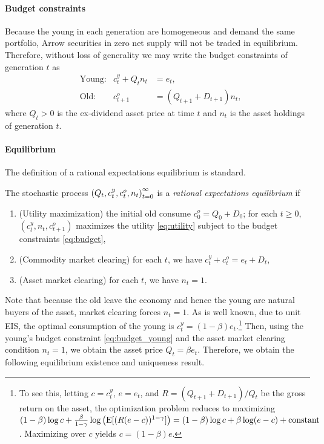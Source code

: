 \documentclass[a4paper,12pt]{article}
\numberwithin{equation}{section}
\theoremstyle{plain}
\begin{document}
\paragraph{Budget constraints}

Because the young in each generation are homogeneous and demand the same portfolio, Arrow securities in zero net supply will not be traded in equilibrium. Therefore, without loss of generality we may write the budget constraints of generation $t$ as
\begin{subequations}\label{eq:budget}
\begin{align}
    &\text{Young:} & c_t^y+Q_tn_t&=e_t, \label{eq:budget_young}\\
    &\text{Old:} & c_{t+1}^o&=(Q_{t+1}+D_{t+1})n_t, \label{eq:budget_old}
\end{align}
\end{subequations}
where $Q_t>0$ is the ex-dividend asset price at time $t$ and $n_t$ is the asset holdings of generation $t$.

\paragraph{Equilibrium}

The definition of a rational expectations equilibrium is standard.

\begin{defn}\label{defn:eq_toy}
The stochastic process $\set{(Q_t,c_t^y,c_t^o,n_t)}_{t=0}^\infty$ is a \emph{rational expectations equilibrium} if
\begin{enumerate}
    \item (Utility maximization) the initial old consume $c_0^o=Q_0+D_0$; for each $t\ge 0$, $(c_t^y,n_t,c_{t+1}^o)$ maximizes the utility \eqref{eq:utility} subject to the budget constraints \eqref{eq:budget},
    \item (Commodity market clearing) for each $t$, we have $c_t^y+c_t^o=e_t+D_t$,
    \item (Asset market clearing) for each $t$, we have $n_t=1$.
\end{enumerate}
\end{defn}

Note that because the old leave the economy and hence the young are natural buyers of the asset, market clearing forces $n_t=1$. As is well known, due to unit EIS, the optimal consumption of the young is $c_t^y=(1-\beta)e_t$.\footnote{To see this, letting $c=c_t^y$, $e=e_t$, and $R=(Q_{t+1}+D_{t+1})/Q_t$ be the gross return on the asset, the optimization problem reduces to maximizing $(1-\beta)\log c+\frac{\beta}{1-\gamma}\log \left(\operatorname{E}[(R(e-c))^{1-\gamma}]\right)=(1-\beta)\log c+\beta \log (e-c)+\text{constant}$. Maximizing over $c$ yields $c=(1-\beta)e$.} Then, using the young's budget constraint \eqref{eq:budget_young} and the asset market clearing condition $n_t=1$, we obtain the asset price $Q_t=\beta e_t$. Therefore, we obtain the following equilibrium existence and uniqueness result.
\end{document}
